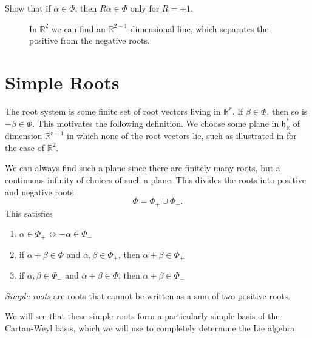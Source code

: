 \begin{exercise}
  Show that if $\alpha \in \Phi$, then  $R \alpha \in \Phi$ only for  $R = \pm 1$.
\end{exercise}

\begin{figure}[tbph]
  \centering
  \def\svgwidth{0.5\columnwidth}
  
  \caption{In $\mathbb{R}^2$ we can find an $\mathbb{R}^{2-1}$-dimensional line, which separates the positive from the negative roots.}
  \label{fig:l18f2}
\end{figure}

\section{Simple Roots}%
\label{sec:simple_roots}


The root system is some finite set of root vectors living in $\mathbb{R}^r$. If $\beta \in \Phi$, then so is  $-\beta \in \Phi$.
This motivates the following definition. 
We choose some plane in $\mathfrak{h}^*_{\mathbb{R}}$ of dimension  $\mathbb{R}^{r-1}$ in which none of the root vectors lie, such as illustrated in %
for the case of $\mathbb{R}^2$.

We can always find such a plane since there are finitely many roots, but a continuous infinity of choices of such a plane.
This divides the roots into positive and negative roots
\begin{equation}
  \Phi = \Phi_+ \cup \Phi_-.
\end{equation}
This satisfies
\begin{enumerate}
  \item $\alpha \in \Phi_+ \iff -\alpha \in \Phi_-$
  \item if $\alpha + \beta \in \Phi$ and $\alpha, \beta \in \Phi_+$, then $\alpha + \beta \in \Phi_+$
  \item if $\alpha, \beta \in \Phi_-$ and $\alpha + \beta \in \Phi$, then $\alpha + \beta \in \Phi_-$
\end{enumerate}
\begin{definition}[]
  \emph{Simple roots} are roots that cannot be written as a sum of two positive roots.
\end{definition}
We will see that these simple roots form a particularly simple basis of the Cartan-Weyl basis, which we will use to completely determine the Lie algebra.
